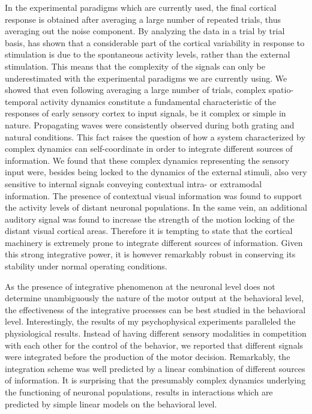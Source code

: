 In the experimental paradigms which are currently used, the final cortical
response is obtained after averaging a large number of repeated trials,
thus averaging out the noise component. By analyzing the data in a trial by
trial basis, \citep{arieli1996a} has shown that a considerable part of the
cortical variability in response to stimulation is due to the spontaneous
activity levels, rather than the external stimulation. This means that the
complexity of the signals can only be underestimated with the experimental
paradigms we are currently using. We showed that even following averaging a
large number of trials, complex spatio-temporal activity dynamics
constitute a fundamental characteristic of the responses of early sensory
cortex to input signals, be it complex or simple in nature. Propagating
waves were consistently observed during both grating and natural
conditions. This fact raises the question of how a system characterized by
complex dynamics can self-coordinate in order to integrate different
sources of information. We found that these complex dynamics representing
the sensory input were, besides being locked to the dynamics of the
external stimuli, also very sensitive to internal signals conveying
contextual intra- or extramodal information. The presence of contextual
visual information was found to support the activity levels of distant
neuronal populations. In the same vein, an additional auditory signal was
found to increase the strength of the motion locking of the distant visual
cortical areas. Therefore it is tempting to state that the cortical
machinery is extremely prone to integrate different sources of information.
Given this strong integrative power, it is however remarkably robust in
conserving its stability under normal operating conditions.



As the presence of integrative phenomenon at the neuronal level does not
determine unambiguously the nature of the motor output at the behavioral
level, the effectiveness of the integrative processes can be best studied
in the behavioral level. Interestingly, the results of my psychophysical
experiments paralleled the physiological results. Instead of having
different sensory modalities in competition with each other for the control
of the behavior, we reported that different signals were integrated before
the production of the motor decision. Remarkably, the integration scheme
was well predicted by a linear combination of different sources of
information. It is surprising that the presumably complex dynamics
underlying the functioning of neuronal populations, results in interactions
which are predicted by simple linear models on the behavioral level. 


